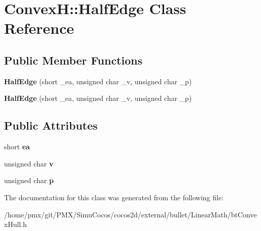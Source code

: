 \hypertarget{classConvexH_1_1HalfEdge}{}\section{ConvexH\+:\+:Half\+Edge Class Reference}
\label{classConvexH_1_1HalfEdge}
\subsection*{Public Member Functions}
\begin{DoxyCompactItemize}
\item 
\mbox{\label{classConvexH_1_1HalfEdge_ad7ef0d696cc1c6cb56788be356c5cb96}} 
{\bfseries Half\+Edge} (short \+\_\+ea, unsigned char \+\_\+v, unsigned char \+\_\+p)
\item 
\mbox{\label{classConvexH_1_1HalfEdge_ad7ef0d696cc1c6cb56788be356c5cb96}} 
{\bfseries Half\+Edge} (short \+\_\+ea, unsigned char \+\_\+v, unsigned char \+\_\+p)
\end{DoxyCompactItemize}
\subsection*{Public Attributes}
\begin{DoxyCompactItemize}
\item 
\mbox{\label{classConvexH_1_1HalfEdge_a99077196d5796ba411125a3115ec62af}} 
short {\bfseries ea}
\item 
\mbox{\label{classConvexH_1_1HalfEdge_ab0656fb9440f481a10ded66c4c499998}} 
unsigned char {\bfseries v}
\item 
\mbox{\label{classConvexH_1_1HalfEdge_a7501507a5ae997454c8c13705c950b4d}} 
unsigned char {\bfseries p}
\end{DoxyCompactItemize}


The documentation for this class was generated from the following file\+:\begin{DoxyCompactItemize}
\item 
/home/pmx/git/\+P\+M\+X/\+Simu\+Cocos/cocos2d/external/bullet/\+Linear\+Math/bt\+Convex\+Hull.\+h\end{DoxyCompactItemize}
